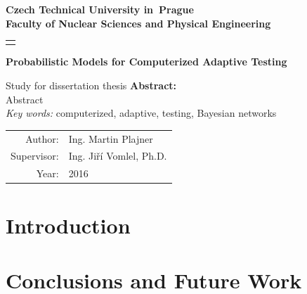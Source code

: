 \documentclass[a4paper,12pt,oneside]{report}
\newcommand{\cvut}{Czech Technical University in~Prague}
\newcommand{\fjfi}{Faculty of Nuclear Sciences and Physical Engineering}
\newcommand{\kse}{}
\newcommand{\nazeven}{Probabilistic Models for Computerized Adaptive Testing}     %
\newcommand{\autor}{Ing. Martin Plajner}           %
\newcommand{\rok}{2016}                %
\newcommand{\vedouci}{Ing. Jiří Vomlel, Ph.D.}         %
\newcommand{\keyword}{computerized, adaptive, testing, Bayesian networks}       %
\newcommand{\abstrEN}{Abstract}                  %
\begin{document}
\thispagestyle{empty}

\begin{center}
    {\Large \bf \cvut\\[2mm] \fjfi }
    \vspace{10mm}

    \begin{tabular}{c}
    {\bf \kse}\\
    \end{tabular}   

      \vspace{10mm}
    \vspace{10mm}

   {\Huge \bf \nazeven}

   
   {\Large Study for dissertation thesis}
  {\center \textbf{Abstract:} } \\
	\abstrEN  \\
  {\em Key words:} 
	{\keyword}
   \vfill
   {\large
    \begin{tabular}{rl}
    Author: & \autor\\
    Supervisor: & \vedouci\\
    Year: & \rok
    \end{tabular}
   }
\end{center}

\newpage  
\tableofcontents 

\newpage %

\chapter*{Introduction}  
 








\chapter*{Conclusions and Future Work}    
% 
\end{document}
